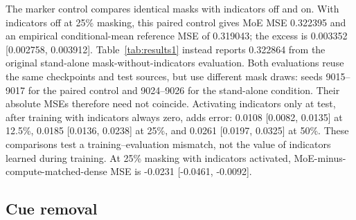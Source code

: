 \documentclass[10pt,letterpaper]{article}
\begin{document}
The marker control compares identical masks with indicators off and on. With indicators off at 25\% masking, this paired control gives MoE MSE 0.322395 and an empirical conditional-mean reference MSE of 0.319043; the excess is 0.003352 [0.002758, 0.003912]. Table~\ref{tab:results1} instead reports 0.322864 from the original stand-alone mask-without-indicators evaluation. Both evaluations reuse the same checkpoints and test sources, but use different mask draws: seeds 9015--9017 for the paired control and 9024--9026 for the stand-alone condition. Their absolute MSEs therefore need not coincide. Activating indicators only at test, after training with indicators always zero, adds error: 0.0108 [0.0082, 0.0135] at 12.5\%, 0.0185 [0.0136, 0.0238] at 25\%, and 0.0261 [0.0197, 0.0325] at 50\%. These comparisons test a training--evaluation mismatch, not the value of indicators learned during training. At 25\% masking with indicators activated, MoE-minus-compute-matched-dense MSE is -0.0231 [-0.0461, -0.0092].


\begin{table}[!htbp]
\centering
\caption{Independent-profile information-loss effects. Effects are changes in raw MSE. Mask indicators remain zero.}
\label{tab:results5}
\small
\setlength{\tabcolsep}{4pt}
\renewcommand{\arraystretch}{1.1}
\ifdim\wd\reporttablebox>\linewidth
\resizebox{\linewidth}{!}{\usebox{\reporttablebox}}
\else\usebox{\reporttablebox}\fi
\end{table}


\subsection{Cue removal}
\end{document}
